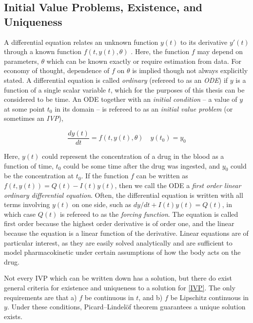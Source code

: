 \subsection{Initial Value Problems, Existence, and Uniqueness}

A differential equation relates an unknown function $y(t)$ to its derivative $y'(t)$ through a known function $f(t, y(t), \theta)$ \cite{morris1963ordinary}. Here, the function $f$ may depend on parameters, $\theta$ which can be known exactly or require estimation from data. For economy of thought, dependence of $f$ on $\theta$ is implied though not always explicitly stated. A differential equation is called \textit{ordinary} (refereed to as an \textit{ODE}) if $y$ is a function of a single scalar variable $t$, which for the purposes of this thesis can be considered to be time. An ODE together with an \textit{initial condition} -- a value of $y$ at some point $t_0$ in its domain --  is refereed to as an \textit{initial value problem} (or sometimes an \textit{IVP}), 

\begin{equation}\label{IVP}
	\dfrac{dy(t)}{dt} = f(t, y(t), \theta) \quad y(t_0) = y_0
\end{equation}

Here, $y(t)$ could represent the concentration of a drug in the blood as a function of time, $t_0$ could be some time after the drug was ingested, and $y_0$ could be the concentration at $t_0$.  If the function $f$ can be written as $f(t, y(t)) = Q(t) - I(t) y(t)$, then we call the ODE a \textit{first order linear ordinary differential equation}.  Often, the differential equation is written with all terms involving $y(t)$ on one side, such as $dy/dt + I(t) y(t) = Q(t)$, in which case $Q(t)$ is refereed to as the \textit{forcing function}.  The equation is called first order because the highest order derivative is of order one, and the linear because the equation is a linear function of the derivative.  Linear equations are of particular interest, as they are easily solved analytically and are sufficient to model pharmacokinetic under certain assumptions of how the body acts on the drug.


Not every IVP which can be written down has a solution, but there do exist general criteria for existence and uniqueness to a solution for \cref{IVP}.  The only requirements are that a) $f$ be continuous in $t$, and b) $f$ be Lipschitz continuous in $y$.  Under these conditions, Picard–Lindelöf theorem \cite{morris1963ordinary} guarantees a unique solution exists.

